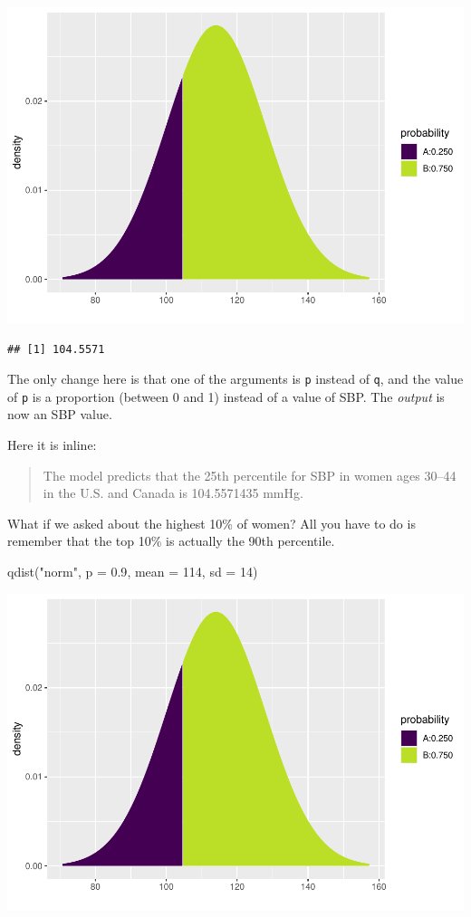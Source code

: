 \documentclass[
]{book}
\newenvironment{Shaded}{\begin{snugshade}}{\end{snugshade}}
\newcommand{\AttributeTok}[1]{\textcolor[rgb]{0.77,0.63,0.00}{#1}}
\newcommand{\DecValTok}[1]{\textcolor[rgb]{0.00,0.00,0.81}{#1}}
\newcommand{\FloatTok}[1]{\textcolor[rgb]{0.00,0.00,0.81}{#1}}
\newcommand{\FunctionTok}[1]{\textcolor[rgb]{0.00,0.00,0.00}{#1}}
\newcommand{\NormalTok}[1]{#1}
\newcommand{\StringTok}[1]{\textcolor[rgb]{0.31,0.60,0.02}{#1}}
\begin{document}
\includegraphics{intro_stats_files/figure-latex/unnamed-chunk-348-1.pdf}

\begin{verbatim}
## [1] 104.5571
\end{verbatim}

The only change here is that one of the arguments is \texttt{p} instead of \texttt{q}, and the value of \texttt{p} is a proportion (between 0 and 1) instead of a value of SBP. The \emph{output} is now an SBP value.

Here it is inline:

\begin{quote}
The model predicts that the 25th percentile for SBP in women ages 30--44 in the U.S. and Canada is 104.5571435 mmHg.
\end{quote}

What if we asked about the highest 10\% of women? All you have to do is remember that the top 10\% is actually the 90th percentile.

\begin{Shaded}
\begin{Highlighting}[]
\FunctionTok{qdist}\NormalTok{(}\StringTok{"norm"}\NormalTok{, }\AttributeTok{p =} \FloatTok{0.9}\NormalTok{, }\AttributeTok{mean =} \DecValTok{114}\NormalTok{, }\AttributeTok{sd =} \DecValTok{14}\NormalTok{)}
\end{Highlighting}
\end{Shaded}

\includegraphics{intro_stats_files/figure-latex/unnamed-chunk-349-1.pdf}
\end{document}

